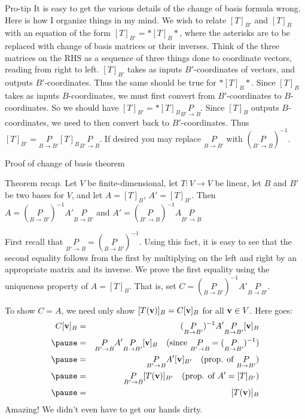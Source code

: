 \begin{frame}{Pro-tip}
 It is easy to get the various details of the change of basis formula wrong. Here is how I organize things in my mind. 
 \bb
 \pause
 \ii We wish to relate $[T]_{B'}$ and $[T]_B$ with an equation of the form $[T]_{B'}=*[T]_B*$, where the asterisks are to be replaced with change of basis matrices or their inverses. Think of the three matrices on the RHS as a sequence of three things done to coordinate vectors, reading from right to left. 
\pause \ii $[T]_{B'}$ takes as inputs $B'$-coordinates of vectors, and outputs $B'$-coordinates. Thus the same should be true for $*[T]_B*$. 
 \pause \ii Since $[T]_B$ takes as inputs $B$-coordinates, we must \alert{first} convert from $B'$-coordinates to $B$-coordinates. So we should have $[T]_{B'}=*[T]_B\underset{B'\rightarrow B}{P}$. 
 \pause \ii Since $[T]_B$ outputs $B$-coordinates, we need to then convert back to $B'$-coordinates. Thus $[T]_{B'}=\underset{B\rightarrow B'}{P}[T]_B\underset{B'\rightarrow B}{P}$. 
 \pause\ii If desired you may replace $\underset{B\rightarrow B'}{P}$ with $\left( \underset{B'\rightarrow B}{P}\right)^{-1}$. 
 \ee
\end{frame}
\begin{frame}{Proof of change of basis theorem}
  
 {\scriptsize
\alert{Theorem recap}. Let $V$ be finite-dimensional, let $T\colon V\rightarrow V$ be linear, let $B$ and $B'$ be two bases for $V$, and let $A=[T]_B$, $A'=[T]_{B'}$. 
\bspace
Then 
$\boxed{A=(\underset{B\rightarrow B'}{P})^{-1}A'\underset{B\rightarrow B'}{P}}$
and 
$\boxed{A'=(\underset{B'\rightarrow B}{P})^{-1}A\underset{B'\rightarrow B}{P}}$
}

\bpause
First recall that $\underset{B'\rightarrow B}{P}=(\underset{B\rightarrow B'}{P})^{-1}$. Using this fact, it is easy to see that the second equality follows from the first by multiplying on the left and right by an appropriate matrix and its inverse. 
\bpause 
We prove the first equality using the \alert{uniqueness property} of $A=[T]_B$. 
\bpause
That is, set $C=(\underset{B\rightarrow B'}{P})^{-1}A'\underset{B\rightarrow B'}{P}$. 

To show $C=A$, we need only show $[T({\mathbf v})]_B=C[{\mathbf v}]_B$ for all ${\mathbf v}\in V$. Here goes:
\pause
\begin{eqnarray*}
C[\boldv]_B&=&(\underset{B\rightarrow B'}{P})^{-1}A'\underset{B\rightarrow B'}{P}[\boldv]_B \\
\pause &=&\underset{B'\rightarrow B}{P}A'\underset{B\rightarrow B'}{P}[\boldv]_B\hspace{10pt} (\text{since }\underset{B'\rightarrow B}{P}=(\underset{B\rightarrow B'}{P})^{-1})\\
\pause &=&\underset{B'\rightarrow B}{P}A'[\boldv]_{B'} \hspace{10pt} \text{(prop. of $\underset{B\rightarrow B'}{P}$)}\\
\pause &=&\underset{B'\rightarrow B}{P}[T(\boldv)]_{B'} \hspace{10pt} \text{(prop. of $A'=[T]_{B'}$)}\\
\pause&=&[T(\boldv)]_{B}
\end{eqnarray*}
\pause Amazing! We didn't even have to get our hands dirty. 
\end{frame}
